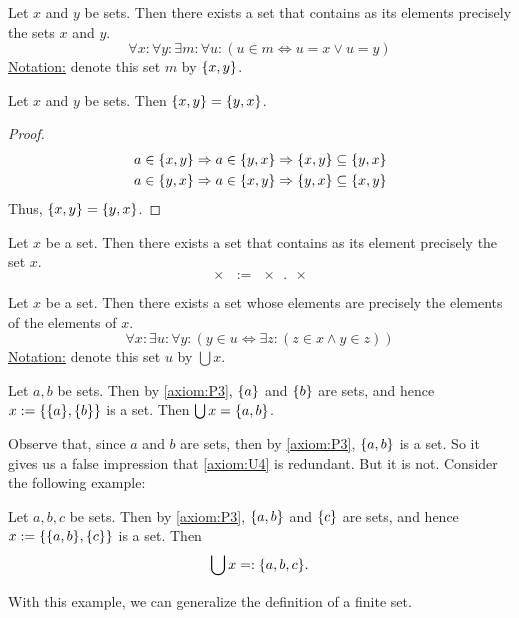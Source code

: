 \begin{axiom}\label{axiom:P3}
	Let \(x\) and \(y\) be sets. Then there exists a set that contains as its elements precisely the sets \(x\) and \(y\).
	\begin{equation}
		\forall x: \forall y: \exists m: \forall u: (u \in m \iff u = x \lor u = y)
	\end{equation}
	\uline{Notation:} denote this set \(m\) by \(\qty{x, y}\).
\end{axiom}

\begin{theorem}\label{thm:order_pair}
	Let \(x\) and \(y\) be sets. Then \(\qty{x, y} = \qty{y, x}\).
\end{theorem}
\begin{proof}
	\begin{align*}
		a \in \qty{x, y} & \Rightarrow a \in \qty{y, x} \Rightarrow \qty{x, y} \subseteq \qty{y, x} \\
		a \in \qty{y, x} & \Rightarrow a \in \qty{x, y} \Rightarrow \qty{y, x} \subseteq \qty{x, y}
	\end{align*}
	Thus, \(\qty{x, y} = \qty{y, x}\).
\end{proof}

\begin{definition}
	Let \(x\) be a set. Then there exists a set that contains as its element precisely the set \(x\).
	\begin{equation}
		\qty{x} := \qty{x, x}
	\end{equation}
\end{definition}

\begin{axiom}\label{axiom:U4}
	Let \(x\) be a set. Then there exists a set whose elements are precisely the elements of the elements of \(x\).
	\begin{equation}
		\forall x: \exists u: \forall y: (y \in u \iff \exists z: (z \in x \land y \in z))
	\end{equation}
	\uline{Notation:} denote this set \(u\) by \(\bigcup x\).
\end{axiom}

\begin{example}
	Let \(a, b\) be sets. Then by \cref{axiom:P3}, \(\qty{a}\) and \(\qty{b}\) are sets, and hence \(x := \qty{\qty{a}, \qty{b}}\) is a set. Then \(\bigcup x = \qty{a, b}\).
\end{example}
Observe that, since \(a\) and \(b\) are sets, then by \cref{axiom:P3}, \(\qty{a, b}\) is a set. So it gives us a false impression that \cref{axiom:U4} is redundant. But it is not. Consider the following example:
\begin{example}
	Let \(a, b, c\) be sets. Then by \cref{axiom:P3}, \(\qty{a, b}\) and \(\qty{c}\) are sets, and hence \(x := \qty{\qty{a, b}, \qty{c}}\) is a set. Then
	\begin{equation}
		\bigcup x =: \qty{a, b, c}.
	\end{equation}
\end{example}
With this example, we can generalize the definition of a finite set.


